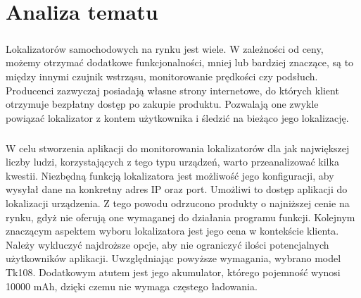 \chapter{Analiza tematu}

\paragraph{}
Lokalizatorów samochodowych na rynku jest wiele. W zależności od ceny, możemy otrzymać dodatkowe funkcjonalności, mniej lub bardziej znaczące, są to między innymi czujnik wstrząsu, monitorowanie prędkości czy podsłuch. Producenci zazwyczaj posiadają własne strony internetowe, do których klient otrzymuje bezpłatny dostęp po zakupie produktu. Pozwalają one zwykle powiązać lokalizator z kontem użytkownika i śledzić na bieżąco jego lokalizację.

\paragraph{}
W celu stworzenia aplikacji do monitorowania lokalizatorów dla jak największej liczby ludzi, korzystających z tego typu urządzeń, warto przeanalizować kilka kwestii. Niezbędną funkcją lokalizatora jest możliwość jego konfiguracji, aby wysyłał dane na konkretny adres IP oraz port. Umożliwi to dostęp aplikacji do lokalizacji urządzenia. Z tego powodu odrzucono produkty o najniższej cenie na rynku, gdyż nie oferują one wymaganej do działania programu funkcji. Kolejnym znaczącym aspektem wyboru lokalizatora jest jego cena w kontekście klienta. Należy wykluczyć najdroższe opcje, aby nie ograniczyć ilości potencjalnych użytkowników aplikacji. Uwzględniając powyższe wymagania, wybrano model Tk108. Dodatkowym atutem jest jego akumulator, którego pojemność wynosi 10000 mAh, dzięki czemu nie wymaga częstego ładowania.

